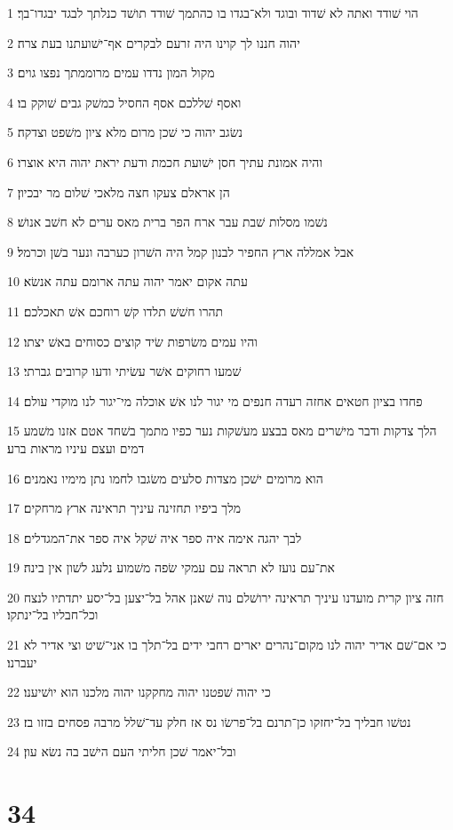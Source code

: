 \par 1 הוי שׁודד ואתה לא שׁדוד ובוגד ולא־בגדו בו כהתמך שׁודד תושׁד כנלתך לבגד יבגדו־בך׃
\par 2 יהוה חננו לך קוינו היה זרעם לבקרים אף־ישׁועתנו בעת צרה׃
\par 3 מקול המון נדדו עמים מרוממתך נפצו גוים׃
\par 4 ואסף שׁללכם אסף החסיל כמשׁק גבים שׁוקק בו׃
\par 5 נשׂגב יהוה כי שׁכן מרום מלא ציון משׁפט וצדקה׃
\par 6 והיה אמונת עתיך חסן ישׁועת חכמת ודעת יראת יהוה היא אוצרו׃
\par 7 הן אראלם צעקו חצה מלאכי שׁלום מר יבכיון׃
\par 8 נשׁמו מסלות שׁבת עבר ארח הפר ברית מאס ערים לא חשׁב אנושׁ׃
\par 9 אבל אמללה ארץ החפיר לבנון קמל היה השׁרון כערבה ונער בשׁן וכרמל׃
\par 10 עתה אקום יאמר יהוה עתה ארומם עתה אנשׂא׃
\par 11 תהרו חשׁשׁ תלדו קשׁ רוחכם אשׁ תאכלכם׃
\par 12 והיו עמים משׂרפות שׂיד קוצים כסוחים באשׁ יצתו׃
\par 13 שׁמעו רחוקים אשׁר עשׂיתי ודעו קרובים גברתי׃
\par 14 פחדו בציון חטאים אחזה רעדה חנפים מי יגור לנו אשׁ אוכלה מי־יגור לנו מוקדי עולם׃
\par 15 הלך צדקות ודבר מישׁרים מאס בבצע מעשׁקות נער כפיו מתמך בשׁחד אטם אזנו משׁמע דמים ועצם עיניו מראות ברע׃
\par 16 הוא מרומים ישׁכן מצדות סלעים משׂגבו לחמו נתן מימיו נאמנים׃
\par 17 מלך ביפיו תחזינה עיניך תראינה ארץ מרחקים׃
\par 18 לבך יהגה אימה איה ספר איה שׁקל איה ספר את־המגדלים׃
\par 19 את־עם נועז לא תראה עם עמקי שׂפה משׁמוע נלעג לשׁון אין בינה׃
\par 20 חזה ציון קרית מועדנו עיניך תראינה ירושׁלם נוה שׁאנן אהל בל־יצען בל־יסע יתדתיו לנצח וכל־חבליו בל־ינתקו׃
\par 21 כי אם־שׁם אדיר יהוה לנו מקום־נהרים יארים רחבי ידים בל־תלך בו אני־שׁיט וצי אדיר לא יעברנו׃
\par 22 כי יהוה שׁפטנו יהוה מחקקנו יהוה מלכנו הוא יושׁיענו׃
\par 23 נטשׁו חבליך בל־יחזקו כן־תרנם בל־פרשׂו נס אז חלק עד־שׁלל מרבה פסחים בזזו בז׃
\par 24 ובל־יאמר שׁכן חליתי העם הישׁב בה נשׂא עון׃

\chapter{34}

